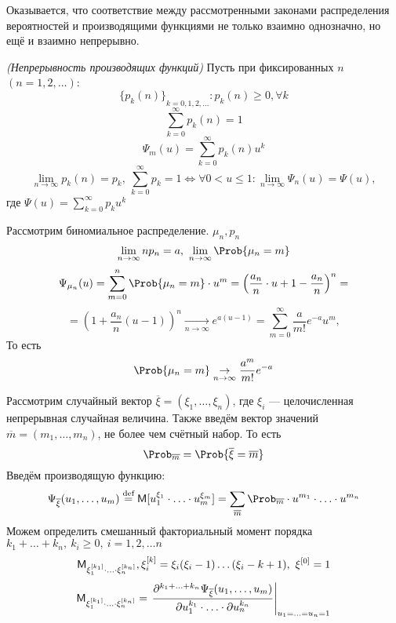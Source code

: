 Оказывается, что соответствие между рассмотренными законами распределения вероятностей и производящими функциями не только взаимно однозначно, но ещё и взаимно непрерывно.
\begin{theorem} \textit{(Непрерывность производящих функций)} 
	Пусть при фиксированных $n$ $(n = 1, 2, \ldots)$:
	\[
		{\{ p_k (n) \}}_{k = 0, 1, 2, \ldots} : p_k (n) \geqslant 0, \forall k
	\]
	\[
		\sum\limits_{k = 0}^{\infty} p_k (n) = 1
	\]
	\[
		\Psi_m (u) = \sum\limits_{k = 0}^{\infty} p_k (n) u^k
	\]
	\[
		\lim\limits_{n \to \infty} p_k (n) = p_k, \ \sum\limits_{k = 0}^{\infty} p_k = 1 \Leftrightarrow \forall 0 < u \leqslant 1: \lim\limits_{n \to \infty} \Psi_n (u) = \Psi (u),
	\]
	где $\Psi (u) = \sum\limits_{k = 0}^{\infty} p_k u^k$
\end{theorem}
\begin{example}
	Рассмотрим биномиальное распределение. $\mu_n, p_n$
	\[
		\lim\limits_{n \to \infty} n p_n = a, \ \lim\limits_{n \to \infty} \Prob \{ \mu_n = m \}
	\]
	\[
		\Psi_{\mu_n} (u) = \sum\limits_{m = 0}^{n} \Prob \{ \mu_n = m \} \cdot u^m = \left( \frac{a_n}{n} \cdot u + 1 - \frac{a_n}{n} \right)^n =
	\]
	\[
		= \left( 1 + \frac{a_n}{n} (u - 1) \right)^n \underset{n \to \infty}{\rightarrow} e^{a(u - 1)} = \sum\limits_{m = 0}^{\infty} \frac{a}{m!} e^{-a} u^m,
	\]
	То есть
	\[
		\Prob \{ \mu_n = m \} \underset{n \to \infty}{\rightarrow} \frac{a^m}{m!} e^{-a}
	\]
\end{example}
Рассмотрим случайный вектор $\overline{\xi} = (\xi_1, \ldots, \xi_n)$, где $\xi_i$ --- целочисленная непрерывная случайная величина. Также введём вектор значений $\overline{m} = (m_1, \ldots, m_n)$, не более чем счётный набор. То есть
\[
	\Prob_{\overline{m}} = \Prob \{ \overline{\xi} = \overline{m} \}
\]
Введём производящую функцию:
\[
	\Psi_{\overline{\xi}} (u_1, \ldots, u_m) \overset{\textrm{def}}{=} \MExpect [u_1^{\xi_1} \cdot \ldots \cdot u_m^{\xi_m}] = \sum\limits_{\overline{m}} \Prob_{\overline{m}} \cdot u^{m_1} \cdot \ldots \cdot u^{m_n}
\]
Можем определить смешанный факториальный момент порядка $k_1 + \ldots + k_n, \ k_i \geqslant 0, \ i = 1, 2, \ldots n$
\[
	\mathsf{M}_{\xi_1^{[k_1]} \cdot \ldots \cdot \xi_n^{[k_n]}}, \xi_i^{[k]} = \xi_i (\xi_i - 1) \ldots (\xi_i - k + 1), \ \xi^{[0]} = 1
\]
\[
	\mathsf{M}_{\xi_1^{[k_1]} \cdot \ldots \cdot \xi_n^{[k_n]}} = 
\left. \frac{ \partial^{k_1 + \ldots + k_n} \Psi_{\overline{\xi}} (u_1, \ldots, u_m) }{ \partial u_1^{k_1} \cdot \ldots \cdot \partial u_n^{k_n} } \right|_{u_1 = \ldots = u_n = 1}
\]

